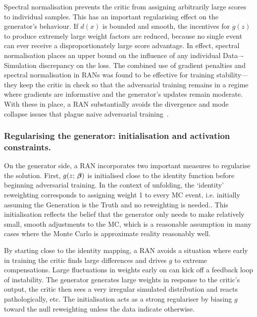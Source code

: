 {{            Spectral normalisation prevents the critic from assigning arbitrarily large scores to individual samples.
            This has an important regularising effect on the generator’s behaviour.
            If $d(x)$ is bounded and smooth, the incentives for $g(z)$ to produce extremely large weight factors are reduced, because no single event can ever receive a disproportionately large score advantage.
            In effect, spectral normalisation places an upper bound on the influence of any individual Data–-Simulation discrepancy on the loss.
            The combined use of gradient penalties and spectral normalisation in RANs was found to be effective for training stability---they keep the critic in check so that the adversarial training remains in a regime where gradients are informative and the generator’s updates remain moderate.
            With these in place, a RAN substantially avoids the divergence and mode collapse issues that plague naive adversarial training~\cite{goodfellow_nips_2017, wiatrak_stabilizing_2020, Qian2021SelfNetworks, chenCDEGANCooperativeDual2021}.

        \subsubsection{Regularising the generator: initialisation and activation constraints.}
            On the generator side, a RAN incorporates two important measures to regularise the solution.
            First, $g(z;\,\vb*\beta)$ is initialised close to the identity function before beginning adversarial training.
            In the context of unfolding, the `identity' reweighting corresponds to assigning weight 1 to every MC event, i.e. initially assuming the Generation is the Truth and no reweighting is needed..
            This initialisation reflects the belief that the generator only needs to make relatively small, smooth adjustments to the MC, which is a reasonable assumption in many cases where the Monte Carlo is approximate reality reasonably well.
            
            By starting close to the identity mapping, a RAN avoids a situation where early in training the critic finds large differences and drives $g$ to extreme compensations.
            Large fluctuations in weights early on can kick off a feedback loop of instability.
            The generator generates large weights in response to the critic's output, the critic then sees a very irregular simulated distribution and reacts pathologically, etc.
            The initialisation acts as a strong regulariser by biasing $g$ toward the null reweighting unless the data indicate otherwise.
            
}}
